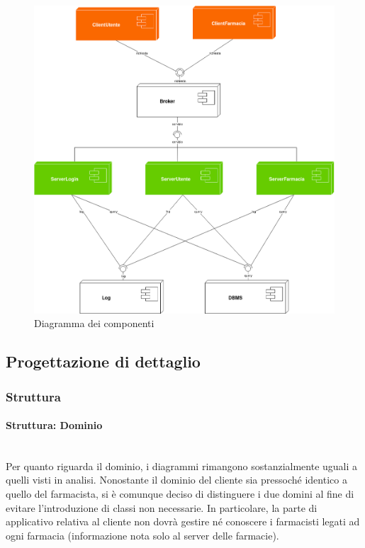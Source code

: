 \newpage

\begin{figure}[h!]
    \begin{center}
        \includegraphics[width=\textwidth]{immagini/Componenti-progettazione.png}
        \caption{Diagramma dei componenti}
    \end{center}
\end{figure}

\newpage

\subsection{Progettazione di dettaglio}

\subsubsection{Struttura}

\paragraph{Struttura: Dominio}\mbox{}\\

Per quanto riguarda il dominio, i diagrammi rimangono sostanzialmente uguali a quelli visti in analisi.
Nonostante il dominio del cliente sia pressoché identico a quello del farmacista, 
si è comunque deciso di distinguere i due domini al fine di evitare l'introduzione di classi non necessarie.
In particolare, la parte di applicativo relativa al cliente non dovrà gestire né conoscere i farmacisti legati ad ogni farmacia (informazione nota solo al server delle farmacie).

